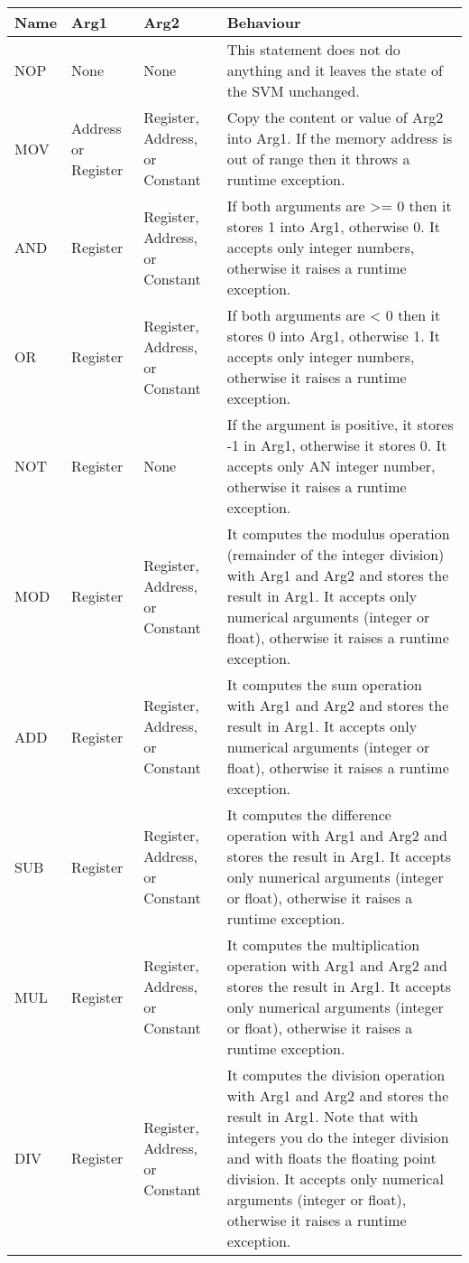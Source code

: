 \begin{longtable}{|p{1cm}|p{2cm}|p{2cm}|p{5cm}|}
	\hline
	\textbf{Name} & \textbf{Arg1} & \textbf{Arg2} & \textbf{Behaviour} \\
	\hline
	NOP & None & None & This statement does not do anything and it leaves the state of the SVM unchanged. \\
	\hline
	MOV & Address or Register & Register, Address, or Constant & Copy the content or value of Arg2 into Arg1. If the memory address is out of range then it throws a runtime exception. \\
	\hline
	AND & Register & Register, Address, or Constant & If both arguments are >= 0 then it stores 1 into Arg1, otherwise 0. It accepts only integer numbers, otherwise it raises a runtime exception. \\
	\hline
	OR & Register & Register, Address, or Constant & If both arguments are < 0 then it stores 0 into Arg1, otherwise 1. It accepts only integer numbers, otherwise it raises a runtime exception. \\
	\hline
	NOT & Register & None & If the argument is positive, it stores -1 in Arg1, otherwise it stores 0. It accepts only AN integer number, otherwise it raises a runtime exception. \\
	\hline
	MOD & Register & Register, Address, or Constant & It computes the modulus operation (remainder of the integer division) with Arg1 and Arg2 and stores the result in Arg1. It accepts only numerical arguments (integer or float), otherwise it raises a runtime exception. \\
	\hline
	ADD & Register & Register, Address, or Constant & It computes the sum operation with Arg1 and Arg2 and stores the result in Arg1. It accepts only numerical arguments (integer or float), otherwise it raises a runtime exception. \\
	\hline
	SUB & Register & Register, Address, or Constant & It computes the difference operation with Arg1 and Arg2 and stores the result in Arg1. It accepts only numerical arguments (integer or float), otherwise it raises a runtime exception. \\
	\hline
	MUL & Register & Register, Address, or Constant & It computes the multiplication operation with Arg1 and Arg2 and stores the result in Arg1. It accepts only numerical arguments (integer or float), otherwise it raises a runtime exception. \\
	\hline
	DIV & Register & Register, Address, or Constant & It computes the division operation with Arg1 and Arg2 and stores the result in Arg1. Note that with integers you do the integer division and with floats the floating point division. It accepts only numerical arguments (integer or float), otherwise it raises a runtime exception. \\

\end{longtable}
